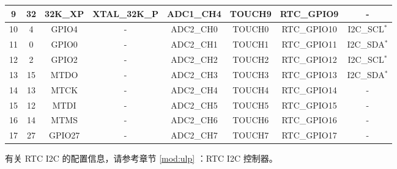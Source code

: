 \begin{small}
\begin{longtable}[c]{|c|c|c|c|c|c|c|c| }
  9 & 32 & 32K\_XP      & XTAL\_32K\_P & ADC1\_CH4    & TOUCH9  & RTC\_GPIO9 & -     \\
 \hline
 10 &  4 & GPIO4        & -            & ADC2\_CH0    & TOUCH0  & RTC\_GPIO10 & I2C\_SCL$^*$     \\
 \hline
 11 &  0 & GPIO0        & -            & ADC2\_CH1    & TOUCH1   & RTC\_GPIO11 & I2C\_SDA$^*$   \\
 \hline
 12 &  2 & GPIO2        & -            & ADC2\_CH2    & TOUCH2  & RTC\_GPIO12 & I2C\_SCL$^*$     \\
 \hline
 13 & 15 & MTDO         & -            & ADC2\_CH3    & TOUCH3  & RTC\_GPIO13 & I2C\_SDA$^*$    \\
 \hline
 14 & 13 & MTCK         & -            & ADC2\_CH4    & TOUCH4  & RTC\_GPIO14 & -    \\
 \hline
 15 & 12 & MTDI         & -            & ADC2\_CH5    & TOUCH5  & RTC\_GPIO15 & -     \\
 \hline
 16 & 14 & MTMS         & -            & ADC2\_CH6    & TOUCH6   & RTC\_GPIO16 & -    \\
 \hline
 17 & 27 & GPIO27       & -            & ADC2\_CH7    & TOUCH7    & RTC\_GPIO17 & -  \\
 \hline
 \end{longtable}
 \end{small}
 \begin{tiplisting}
 有关 RTC I2C 的配置信息，请参考章节 \ref{mod:ulp} \textit{}：RTC I2C 控制器。
 \end{tiplisting}
